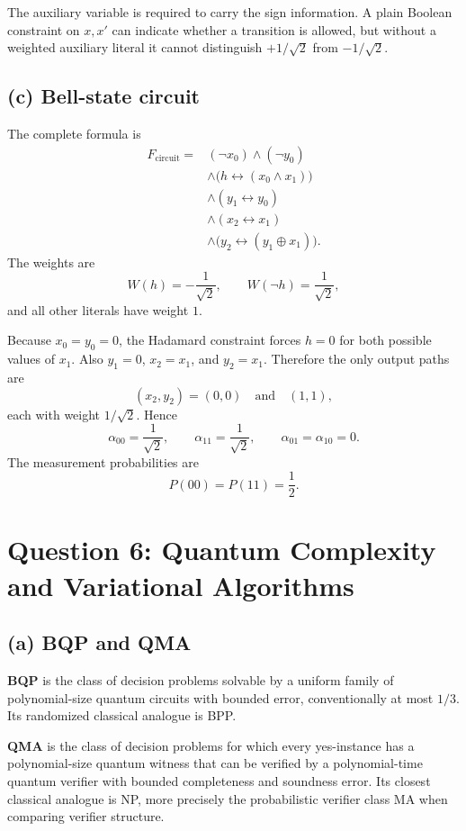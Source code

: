 \documentclass[11pt,a4paper]{article}
\begin{document}
The auxiliary variable is required to carry the sign information. A plain Boolean
constraint on $x,x'$ can indicate whether a transition is allowed, but without a
weighted auxiliary literal it cannot distinguish $+1/\sqrt2$ from $-1/\sqrt2$.

\subsection*{(c) Bell-state circuit}
The complete formula is
\begin{align*}
F_{\mathrm{circuit}}={}&(\neg x_0)\land(\neg y_0)\\
&\land\bigl(h\leftrightarrow(x_0\land x_1)\bigr)\\
&\land(y_1\leftrightarrow y_0)\\
&\land(x_2\leftrightarrow x_1)\\
&\land\bigl(y_2\leftrightarrow(y_1\oplus x_1)\bigr).
\end{align*}
The weights are
\[
W(h)=-\frac1{\sqrt2},\qquad W(\neg h)=\frac1{\sqrt2},
\]
and all other literals have weight $1$.

Because $x_0=y_0=0$, the Hadamard constraint forces $h=0$ for both possible values
of $x_1$. Also $y_1=0$, $x_2=x_1$, and $y_2=x_1$. Therefore the only output paths are
\[
(x_2,y_2)=(0,0)\quad\text{and}\quad(1,1),
\]
each with weight $1/\sqrt2$. Hence
\[
\alpha_{00}=\frac1{\sqrt2},
\qquad
\alpha_{11}=\frac1{\sqrt2},
\qquad
\alpha_{01}=\alpha_{10}=0.
\]
The measurement probabilities are
\[
\boxed{P(00)=P(11)=\frac12.}
\]

\newpage
\section*{Question 6: Quantum Complexity and Variational Algorithms}

\subsection*{(a) BQP and QMA}
\textbf{BQP} is the class of decision problems solvable by a uniform family of
polynomial-size quantum circuits with bounded error, conventionally at most $1/3$.
Its randomized classical analogue is BPP.

\textbf{QMA} is the class of decision problems for which every yes-instance has a
polynomial-size quantum witness that can be verified by a polynomial-time quantum
verifier with bounded completeness and soundness error. Its closest classical analogue
is NP, more precisely the probabilistic verifier class MA when comparing verifier structure.
\end{document}
